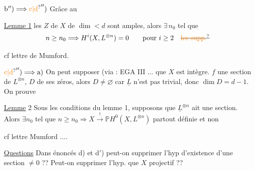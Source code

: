 $\mathrm{b}'')\Longrightarrow\unsure{\mathrm{c}|\mathrm{d}}'')$ Grâce au

\uline{Lemme 1}  les   $Z$ de $X$ de $\dim<d$ sont amples, alors $\exists\,n_0$ tel que
\[
 n\geq n_0\Longrightarrow H^i(X,L^{\otimes n})=0\qquad\text{pour }i\geq2\quad\deleted{\text{\unsure{les supp.}}}
\]

cf lettre de Mumford.



$\unsure{\mathrm{c}|\mathrm{d}}'')\Longrightarrow\mathrm{a)}$ On peut supposer (via : EGA III ... que $X$ est intègre.    $f$ une section de $L^{\otimes n}$,  $D$  de ses zéros, alors $D\ne\varnothing$ car $\underline L$ n'est pas trivial, donc $\dim D=d-1$. On prouve

\uline{Lemme} 2 Sous les conditions du lemme 1, supposons que  $\underline L^{\otimes n}$ ait une section. Alors \deleted{$\unsure{\exists}$} $\exists n_0$ tel que $n\geq n_0\Longrightarrow X\overset{!}{\longrightarrow}\mathbb P H^0(X,L^{\otimes n})$ partout définie et non 


cf lettre Mumford ....

\uline{Questions} Dans  énoncés d) et d$'$) peut-on supprimer l'hyp d'existence d'une section $\ne0$ ??   Peut-on supprimer l'hyp. que $X$ projectif ??


